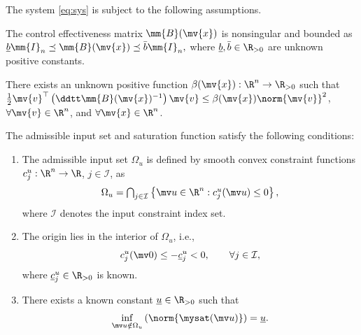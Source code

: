 \documentclass[letterpaper, journal]{IEEEtran}
\begin{document}
The system \eqref{eq:sys} is subject to the following assumptions.

\begin{assum} \label{assum:B:bound}
  The control effectiveness matrix $\mm{B}(\mv{x})$ is nonsingular and bounded as   
  $
    \underline{b}\mm{I}_n
    \preceq 
    \mm{B}(\mv{x})
    \preceq 
    \bar{b}\mm{I}_n
    ,
  $
  where $\underline{b},\bar{b}\in\R_{>0}$ are unknown positive constants.
\end{assum}

\begin{assum} \label{assum:B:bound:grad}
  There exists an unknown positive function $\beta(\mv{x}):\R^n\to\R_{>0}$ such that $\tfrac{1}{2}\mv{v}^\top\left(\ddtt\mm{B}(\mv{x})^{-1}\right)\mv{v} \le \beta(\mv{x})\norm{\mv{v}}^2$, $\forall \mv{v}\in\R^n$, and $\forall \mv{x}\in\R^n$. 
\end{assum}

\begin{assum} \label{assum:sat}
  The admissible input set and saturation function satisfy the following
  conditions:
  \begin{enumerate}
    \item
    The admissible input set $\Omega_u$ is defined by smooth convex
    constraint functions $c_j^u:\R^n\to\R$, $j\in\mathcal I$, as
    \begin{equation*}
      \Omega_u
      =
      \textstyle
      \bigcap_{j\in\mathcal I}
      \left\{
        \mv u\in\R^n:
        c_j^u(\mv u)\le 0
      \right\}
      ,
    \end{equation*}
    where $\mathcal I$ denotes the input constraint index set.

    \item
    The origin lies in the interior of $\Omega_u$, i.e.,
    \begin{equation*}
      c_j^u(\mv 0)
      \le
      -\underline c_j^u
      <
      0
      ,
      \qquad
      \forall j\in\mathcal I
      ,
    \end{equation*}
    where $\underline c_j^u\in\R_{>0}$ is known.

    \item
    There exists a known constant $\underline u\in\R_{>0}$ such that
    \begin{equation*}
      \inf_{\mv u\notin\Omega_u}
      \left(
        \norm{\mysat(\mv u)}
      \right)
      =
      \underline u
      .
    \end{equation*}
  \end{enumerate}
\end{assum}
\end{document}
